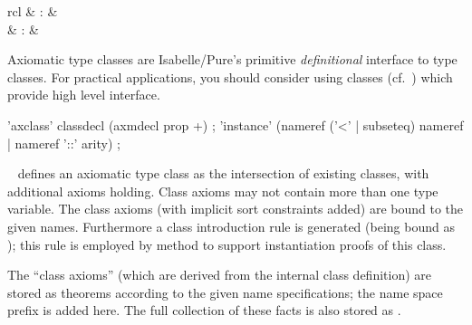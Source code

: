 \begin{isabellebody}
\begin{isamarkuptext}
\begin{itemize}
  \end{itemize}%
\end{isamarkuptext}%
\isamarkuptrue%
%
\isamarkuptrue%
%
\begin{isamarkuptext}%
\begin{matharray}{rcl}
    \hypertarget{command.axclass}{\hyperlink{command.axclass}{\mbox{}}} & : &  \\
    \hypertarget{command.instance}{\hyperlink{command.instance}{\mbox{}}} & : &  \\
  \end{matharray}

  Axiomatic type classes are Isabelle/Pure's primitive
  \emph{definitional} interface to type classes.  For practical
  applications, you should consider using classes
  (cf.~) which provide high level interface.

  \begin{rail}
    'axclass' classdecl (axmdecl prop +)
    ;
    'instance' (nameref ('<' | subseteq) nameref | nameref '::' arity)
    ;
  \end{rail}

  \begin{description}
  
  \item \hyperlink{command.axclass}{\mbox{}}~ defines an
  axiomatic type class as the intersection of existing classes, with
  additional axioms holding.  Class axioms may not contain more than
  one type variable.  The class axioms (with implicit sort constraints
  added) are bound to the given names.  Furthermore a class
  introduction rule is generated (being bound as ); this rule is employed by method \hyperlink{method.intro-classes}{\mbox{}} to support instantiation proofs of this class.
  
  The ``class axioms'' (which are derived from the internal class
  definition) are stored as theorems according to the given name
  specifications; the name space prefix  is added
  here.  The full collection of these facts is also stored as .
  

\end{description}
\end{isamarkuptext}
\end{isabellebody}
